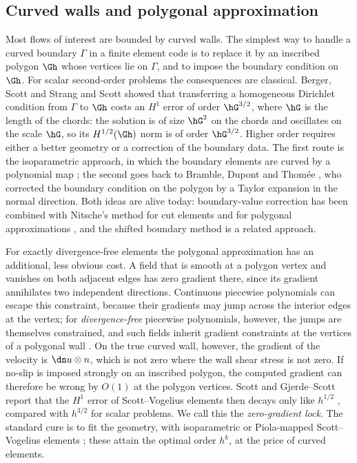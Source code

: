 \subsection{Curved walls and polygonal approximation}
Most flows of interest are bounded by curved walls. The simplest way to handle a curved boundary $\Gamma$ in a finite element code is to replace it by an inscribed polygon $\Gh$ whose vertices lie on $\Gamma$, and to impose the boundary condition on $\Gh$. For scalar second-order problems the consequences are classical. Berger, Scott and Strang \cite{BergerScottStrang1972} and Scott \cite{Scott1975} showed that transferring a homogeneous Dirichlet condition from $\Gamma$ to $\Gh$ costs an $H^1$ error of order $\hG^{3/2}$, where $\hG$ is the length of the chords: the solution is of size $\hG^2$ on the chords and oscillates on the scale $\hG$, so its $H^{1/2}(\Gh)$ norm is of order $\hG^{3/2}$. Higher order requires either a better geometry or a correction of the boundary data. The first route is the isoparametric approach, in which the boundary elements are curved by a polynomial map \cite{Ciarlet1978book}; the second goes back to Bramble, Dupont and Thom\'ee \cite{BrambleDupontThomee1972}, who corrected the boundary condition on the polygon by a Taylor expansion in the normal direction. Both ideas are alive today: boundary-value correction has been combined with Nitsche's method for cut elements \cite{BurmanHansboLarson2018,BurmanHansboLarson2019Stokes} and for polygonal approximations \cite{DupontGuzmanScott2025}, and the shifted boundary method \cite{MainScovazzi2018} is a related approach.

For exactly divergence-free elements the polygonal approximation has an additional, less obvious cost. A field that is smooth at a polygon vertex and vanishes on both adjacent edges has zero gradient there, since its gradient annihilates two independent directions. Continuous piecewise polynomials can escape this constraint, because their gradients may jump across the interior edges at the vertex; for \emph{divergence-free} piecewise polynomials, however, the jumps are themselves constrained, and such fields inherit gradient constraints at the vertices of a polygonal wall \cite{ScottPrize,GjerdeScott2024}. On the true curved wall, however, the gradient of the velocity is $\dn u\otimes n$, which is not zero where the wall shear stress is not zero. If no-slip is imposed strongly on an inscribed polygon, the computed gradient can therefore be wrong by $O(1)$ at the polygon vertices. Scott and Gjerde--Scott report that the $H^1$ error of Scott--Vogelius elements then decays only like $h^{1/2}$ \cite{ScottPrize,GjerdeScott2024}, compared with $h^{3/2}$ for scalar problems. We call this the \emph{zero-gradient lock}. The standard cure is to fit the geometry, with isoparametric or Piola-mapped Scott--Vogelius elements \cite{NeilanOtus2021,DurstNeilan2024}; these attain the optimal order $h^k$, at the price of curved elements.

